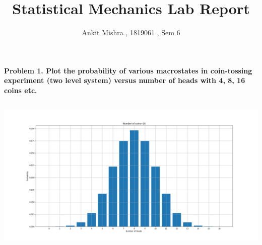 \documentclass{article}
\title{Statistical Mechanics Lab Report}
\author{Ankit Mishra , 1819061 , Sem 6}
\date{  }
\begin{document}
	\maketitle
	
	\textbf{Problem 1. Plot the probability of various macrostates in coin-tossing experiment (two level system) versus number of heads with 4, 8, 16 coins etc. }\\
	\inputminted{python}{prac_2.py}
	\includegraphics[width=15 cm]{prac_2_fig.png}
	
	
\end{document}
